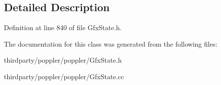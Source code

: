 \subsection{Detailed Description}


Definition at line 840 of file Gfx\+State.\+h.



The documentation for this class was generated from the following files\+:\begin{DoxyCompactItemize}
\item 
thirdparty/poppler/poppler/Gfx\+State.\+h\item 
thirdparty/poppler/poppler/Gfx\+State.\+cc\end{DoxyCompactItemize}
